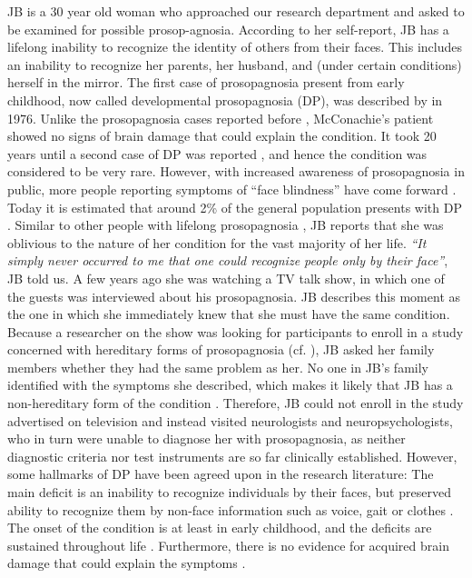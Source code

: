 \documentclass[fleqn,10pt]{SelfArx} %
\begin{document}
JB is a 30 year old woman who approached our research department and asked to be examined for possible prosop-agnosia. According to her self-report, JB has a lifelong inability to recognize the identity of others from their faces. This includes an inability to recognize her parents, her husband, and (under certain conditions) herself in the mirror.
The first case of prosopagnosia present from early childhood, now called developmental prosopagnosia (DP), was described by \citeauthor{McConachie_1976} in 1976. Unlike the prosopagnosia cases reported before \citep{Bodamer_1947, Benton_1968}, McConachie's patient showed no signs of brain damage that could explain the condition. It took 20 years until a second case of DP was reported \citep{Ariel_1996}, and hence the condition was considered to be very rare. However, with increased awareness of prosopagnosia in public, more people reporting symptoms of “face blindness” have come forward \citep{Duchaine_2006curr}. Today it is estimated that around 2\% of the general population presents with DP \citep{Kennerknecht_2008, Bowles_2009}. Similar to other people with lifelong prosopagnosia \citep{Sacks, Fine_2012}, JB reports that she was oblivious to the nature of her condition for the vast majority of her life. \textit{“It simply never occurred to me that one could recognize people only by their face”}, JB told us. A few years ago she was watching a TV talk show, in which one of the guests was interviewed about his prosopagnosia. JB describes this moment as the one in which she immediately knew that she must have the same condition.
Because a researcher on the show was looking for participants to enroll in a study concerned with hereditary forms of prosopagnosia (cf. \citet{De_Haan_1999, GRUETER_2007}), JB asked her family members whether they had the same problem as her. No one in JB's family identified with the symptoms she described, which makes it likely that JB has a non-hereditary form of the condition \citep{Duchaine_2008, Bate_2009}. Therefore, JB could not enroll in the study advertised on television and instead visited neurologists and neuropsychologists, who in turn were unable to diagnose her with prosopagnosia, as neither diagnostic criteria \citep{Shah_2016, Bate_2017} nor test instruments \citep{Bowles_2009} are so far clinically established.
However, some hallmarks of DP have been agreed upon in the research literature: The main deficit is an inability to recognize individuals by their faces, but preserved ability to recognize them by non-face information such as voice, gait or clothes \citep{Rivolta_2012}. The onset of the condition is at least in early childhood, and the deficits are sustained throughout life \citep{Behrmann_2016}. Furthermore, there is no evidence for acquired brain damage that could explain the symptoms \citep{Susilo_2013}.
\end{document}
